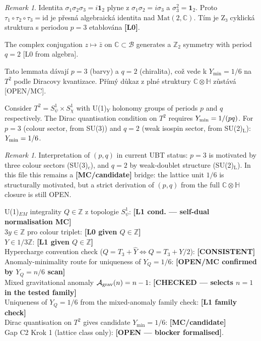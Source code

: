 \documentclass[12pt,a4paper]{article}
\theoremstyle{remark}
\newtheorem{remark}[theorem]{Remark}
\newcommand{\ZZ}{\mathbb{Z}}
\begin{document}
\begin{remark}
Identita $\sigma_1\sigma_2\sigma_3=i\mathbf{1}_2$ plyne z
$\sigma_1\sigma_2=i\sigma_3$ a $\sigma_3^2=\mathbf{1}_2$.
Proto $\tau_1\circ\tau_2\circ\tau_3=\mathrm{id}$ je přesná
algebraická identita nad $\mathrm{Mat}(2,\mathbb{C})$.
Tím je Z₃ cyklická struktura s periodou $p=3$ etablována \textbf{[L0]}.
\end{remark}

\begin{lemma}[q=2 from complex structure]
The complex conjugation $z\mapsto\bar z$ on $\mathbb{C}\subset\mathcal{B}$ generates a $\mathbb{Z}_2$ symmetry with period $q=2$ [L0 from algebra].
\end{lemma}

\noindent
Tato lemmata dávají $p=3$ (barvy) a $q=2$ (chiralita), což vede k $Y_{\min}=1/6$ na $T^2$ podle Diracovy kvantizace. Přímý důkaz z plné struktury $\mathbb{C}\otimes\mathbb{H}$ zůstává [OPEN/MC].
\begin{lemma}
\label{lem:dirac-T2}
Consider $T^2 = S^1_\psi \times S^1_\chi$ with U(1)$_Y$
holonomy groups of periods $p$ and $q$ respectively.
The Dirac quantisation condition on $T^2$ requires
$Y_{\rm min} = 1/(pq)$.
For $p=3$ (colour sector, from SU(3)) and $q=2$
(weak isospin sector, from SU(2)$_{\mathrm{L}}$):
$Y_{\rm min} = 1/6$.
\end{lemma}

\begin{remark}
Interpretation of $(p,q)$ in current UBT status:
$p=3$ is motivated by three colour sectors (SU(3)$_c$),
and $q=2$ by weak-doublet structure (SU(2)$_{\mathrm{L}}$).
In this file this remains a \textbf{[MC/candidate]} bridge:
the lattice unit $1/6$ is structurally motivated, but a strict derivation
of $(p,q)$ from the full $\mathbb{C}\otimes\mathbb{H}$ closure is still OPEN.
\end{remark}

\begin{statusbox}[title={Singlet-integrality theorem --- verdict}]
U(1)$_{EM}$ integrality $Q\in\ZZ$ z topologie $S^1_\psi$: \textbf{[L1 cond. --- self-dual normalisation MC]}\\
$3y\in\ZZ$ pro colour triplet: \textbf{[L0 given $Q\in\ZZ$]}\\
$Y\in1/3\ZZ$: \textbf{[L1 given $Q\in\ZZ$]}\\
Hypercharge convention check ($Q=T_3+\widehat Y \Leftrightarrow Q=T_3+Y/2$): \textbf{[CONSISTENT]}\\
Anomaly-minimality route for uniqueness of $Y_Q=1/6$: \textbf{[OPEN/MC confirmed by \(Y_Q=n/6\) scan]}\\
Mixed gravitational anomaly $\mathcal A_{\rm grav}(n)=n-1$: \textbf{[CHECKED --- selects $n=1$ in the tested family]}\\
Uniqueness of $Y_Q=1/6$ from the mixed-anomaly family check: \textbf{[L1 family check]}\\
Dirac quantisation on $T^2$ gives candidate $Y_{\min}=1/6$: \textbf{[MC/candidate]}\\
Gap C2 Krok 1 (lattice class only): \textbf{[OPEN --- blocker formalised]}.
\end{statusbox}
\end{document}
